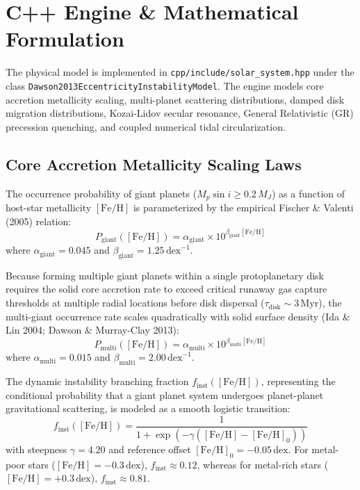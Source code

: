 \documentclass[11pt,a4paper]{article}
\begin{document}
\section{C++ Engine \& Mathematical Formulation}
The physical model is implemented in \texttt{cpp/include/solar\_system.hpp} under the class \texttt{Dawson2013\-Eccentricity\-Instability\-Model}. The engine models core accretion metallicity scaling, multi-planet scattering distributions, damped disk migration distributions, Kozai-Lidov secular resonance, General Relativistic (GR) precession quenching, and coupled numerical tidal circularization.

\subsection{Core Accretion Metallicity Scaling Laws}
The occurrence probability of giant planets ($M_p \sin i \ge 0.2\,M_J$) as a function of host-star metallicity $[\text{Fe/H}]$ is parameterized by the empirical Fischer \& Valenti (2005) relation:
\begin{equation}
P_{\text{giant}}([\text{Fe/H}]) = \alpha_{\text{giant}} \times 10^{\beta_{\text{giant}} [\text{Fe/H}]}
\label{eq:p_giant}
\end{equation}
where $\alpha_{\text{giant}} = 0.045$ and $\beta_{\text{giant}} = 1.25\,\text{dex}^{-1}$.

Because forming multiple giant planets within a single protoplanetary disk requires the solid core accretion rate to exceed critical runaway gas capture thresholds at multiple radial locations before disk dispersal ($\tau_{\text{disk}} \sim 3\,\text{Myr}$), the multi-giant occurrence rate scales quadratically with solid surface density (Ida \& Lin 2004; Dawson \& Murray-Clay 2013):
\begin{equation}
P_{\text{multi}}([\text{Fe/H}]) = \alpha_{\text{multi}} \times 10^{\beta_{\text{multi}} [\text{Fe/H}]}
\label{eq:p_multi}
\end{equation}
where $\alpha_{\text{multi}} = 0.015$ and $\beta_{\text{multi}} = 2.00\,\text{dex}^{-1}$.

The dynamic instability branching fraction $f_{\text{inst}}([\text{Fe/H}])$, representing the conditional probability that a giant planet system undergoes planet-planet gravitational scattering, is modeled as a smooth logistic transition:
\begin{equation}
f_{\text{inst}}([\text{Fe/H}]) = \frac{1}{1 + \exp\left(-\gamma \left([\text{Fe/H}] - [\text{Fe/H}]_0\right)\right)}
\label{eq:f_inst}
\end{equation}
with steepness $\gamma = 4.20$ and reference offset $[\text{Fe/H}]_0 = -0.05\,\text{dex}$. For metal-poor stars ($[\text{Fe/H}] = -0.3\,\text{dex}$), $f_{\text{inst}} \approx 0.12$, whereas for metal-rich stars ($[\text{Fe/H}] = +0.3\,\text{dex}$), $f_{\text{inst}} \approx 0.81$.
\end{document}
